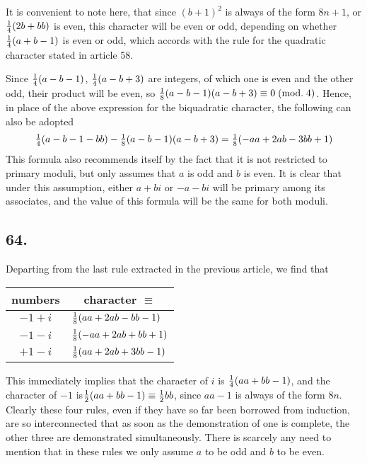 \documentclass[twoside,12pt]{memoir}
\renewcommand{\pmod}[1]{\;(\textrm{mod.}\;#1)}
\let\oldfrac\frac
\def\frac#1#2{\mathchoice{\tfrac{#1}{#2}}{\oldfrac{#1}{#2}}{\genfrac{}{}{}{2}{#1}{#2\mathstrut}}{\genfrac{}{}{}{3}{#1}{#2\mathstrut}}}
\begin{document}
It is convenient to note here, that since \((b+1)^{2}\) is always of the form \(8 n+1\), or \(\frac{1}{4}(2 b+b b)\) is even, this character will be even or odd, depending on whether \(\frac{1}{4}(a+b-1)\) is even or odd, which accords with the rule for the quadratic character stated in article 58.

Since \(\frac{1}{4}(a-b-1)\), \(\frac{1}{4}(a-b+3)\) are integers, of which one is even and the other odd, their product will be even, so \(\frac{1}{8}(a-b-1)(a-b+3) \equiv 0\pmod{4}\). Hence, in place of the above expression for the biquadratic character, the following can also be adopted
\[\frac{1}{4}(a-b-1-b b)-\frac{1}{8}(a-b-1)(a-b+3)=\frac{1}{8}(-a a+2 a b-3 b b+1)\]
This formula also recommends itself by the fact that it is not restricted to primary moduli, but only assumes that \(a\) is odd and \(b\) is even.  It is clear that under this assumption, either \(a+b i\) or \(-a-b i\) will be primary among its associates, and the value of this formula will be the same for both moduli.\pagebreak%

\subsection*{64.}

Departing from the last rule extracted in the previous article, we find that 
\begin{center}
\begin{tabular}{c|l}
numbers & \multicolumn{1}{c}{character \(\equiv\)} \\
\hline
\(-1+i\) & \(\frac{1}{8}(a a+2 a b-b b-1)\) \\
\(-1-i\) & \(\frac{1}{8}(-a a+2 a b+b b+1)\) \\
\(+1-i\) & \(\frac{1}{8}(a a+2 a b+3 b b-1)\) \\
\end{tabular}
\end{center}
This immediately implies that the character of \(i\) is \(\frac{1}{4}(a a+b b-1)\), and the character of \(-1\) is\(\frac{1}{2}(a a+b b-1) \equiv \frac{1}{2} b b\), since \(a a-1\) is always of the form \(8n\). Clearly these four rules, even if they have so far been borrowed from induction, are so interconnected that as soon as the demonstration of one is complete, the other three are demonstrated simultaneously. There is scarcely any need to mention that in these rules we only assume \(a\) to be odd and \(b\) to be even.
\end{document}
